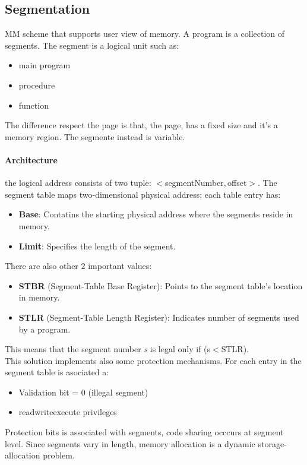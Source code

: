 \documentclass[12pt]{article}
\begin{document}
\subsection{Segmentation}
MM scheme that supports user view of memory. A program is a collection of segments. The segment is a logical unit such as:
\begin{itemize}
  \item main program \item procedure \item function
\end{itemize}
The difference respect the page is that, the page, has a fixed size and it's a memory region. The segmente instead is variable.\\
\paragraph{Architecture} the logical address consists of two tuple: $<$segmentNumber$, $offset$>$. The segment table maps two-dimensional physical address; each table entry has:
\begin{itemize}
  \item \textbf{Base}: Contatins the starting physical address where the segments reside in memory.
  \item \textbf{Limit}: Specifies the length of the segment.
\end{itemize}
There are also other 2 important values:
\begin{itemize}
  \item \textbf{STBR} (Segment-Table Base Register): Points to the segment table's location in memory.
  \item \textbf{STLR} (Segment-Table Length Register): Indicates number of segments used by a program.
\end{itemize}
This means that the segment number \textit{s} is legal only if (s$<$STLR).\\
This solution implements also some protection mechanisms. For each entry in the segment table is asociated a:
\begin{itemize}
  \item Validation bit = 0 (illegal segment)
  \item read\/write\/execute privileges
\end{itemize}
Protection bits is associated with segments, code sharing occcurs at segment level. Since segments vary in length, memory allocation is a dynamic storage-allocation problem.
\end{document}
